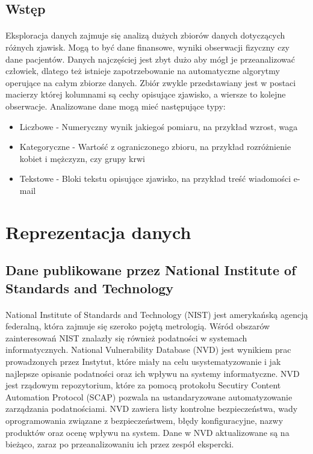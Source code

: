 \documentclass[a4paper,12pt,twoside]{article}
\begin{document}
\subsection{Wstęp}
\paragraph{}
Eksploracja danych zajmuje się analizą dużych zbiorów danych dotyczących różnych zjawisk. Mogą to być dane finansowe, wyniki obserwacji fizyczny czy dane pacjentów. Danych najczęściej jest zbyt dużo aby mógł je przeanalizować człowiek, dlatego też istnieje zapotrzebowanie na automatyczne algorytmy operujące na całym zbiorze danych. Zbiór zwykle przedstawiany jest w postaci macierzy której kolumnami są cechy opisujące zjawisko, a wiersze to kolejne obserwacje. Analizowane dane mogą mieć następujące typy:
\begin{itemize}
    \item Liczbowe - Numeryczny wynik jakiegoś pomiaru, na przykład wzrost, waga
    \item Kategoryczne - Wartość z ograniczonego zbioru, na przykład rozróżnienie kobiet i mężczyzn, czy grupy krwi
    \item Tekstowe - Bloki tekstu opisujące zjawisko, na przykład treść wiadomości e-mail 
\end{itemize}
\paragraph{}
\newpage
\thispagestyle{empty}
\mbox{}

\newpage
\section{Reprezentacja danych}
\subsection{Dane publikowane przez National Institute of Standards and Technology}
\paragraph{}
National Institute of Standards and Technology (NIST) jest amerykańską agencją federalną, która zajmuje się szeroko pojętą metrologią. Wśród obszarów zainteresowań NIST znalazły się również podatności w systemach informatycznych. \cite{nist_official} National Vulnerability Database (NVD) jest wynikiem prac prowadzonych przez Instytut, które miały na celu usystematyzowanie i jak najlepsze opisanie podatności oraz ich wpływu na systemy informatyczne. NVD jest rządowym repozytorium, które za pomocą protokołu Secutiry Content Automation Protocol (SCAP) pozwala na ustandaryzowane automatyzowanie zarządzania podatnościami. NVD zawiera listy kontrolne bezpieczeństwa, wady oprogramowania związane z bezpieczeństwem, błędy konfiguracyjne, nazwy produktów oraz ocenę wpływu na system. Dane w NVD aktualizowane są na bieżąco, zaraz po przeanalizowaniu ich przez zespół ekspercki. \cite{nvd_official} 
\end{document}
